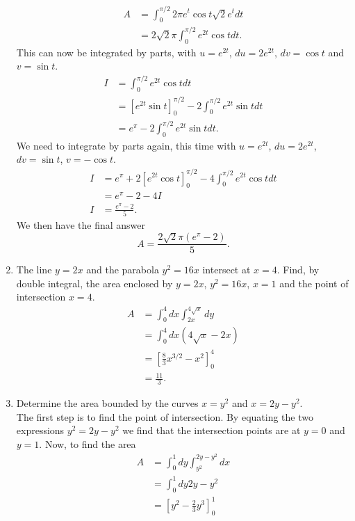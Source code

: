 \documentclass{article}
\begin{document}
\begin{enumerate}
{\begin{align*}
			A &= \int_0^{\pi/2} 2 \pi e^t \cos t \sqrt{2} e^t dt \\
			&= 2\sqrt{2} \pi \int_0^{\pi/2} e^{2t} \cos t dt .
		\end{align*}		
		This can now be integrated by parts, with $u = e^{2t}$, $du = 2e^{2t}$, $dv = \cos t$ and $v = \sin t$.  
		\begin{align*}
			I &= \int_0^{\pi/2} e^{2t} \cos t dt \\
			&= \left[ e^{2t} \sin t \right]_0^{\pi/2} - 2 \int_0^{\pi/2} e^{2t} \sin t dt \\
			&= e^{\pi} - 2 \int_0^{\pi/2} e^{2t} \sin t dt .
		\end{align*}			
		We need to integrate by parts again, this time with $u = e^{2t}$, $du = 2 e^{2t}$, $dv = \sin t$, $v = -\cos t$.
		\begin{align*}
			I &= e^{\pi} + 2\left[ e^{2t} \cos t\right]_0^{\pi/2} - 4 \int_0^{\pi/2} e^{2t} \cos t dt \\
			&= e^{\pi} - 2 - 4 I \\
			I &= \frac{e^\pi - 2}{5} .
		\end{align*}
		We then have the final answer
		\begin{equation*}
			A = \frac{2 \sqrt{2} \pi (e^\pi - 2)}{5} .
		\end{equation*}
	}
	\item{The line $y = 2x$ and the parabola $y^2 = 16x$ intersect at $x=4$.  Find, by double integral, the area enclosed by $y = 2x$, $y^2 = 16x$, $x=1$ and the point of intersection $x=4$.
		\begin{align*}
			A &= \int_0^4 dx \int_{2x}^{4\sqrt{x}} dy \\
			&= \int_0^4 dx \left( 4\sqrt{x} - 2x \right) \\
			&= \left[ \frac{8}{3} x^{3/2} - x^2 \right]_0^4 \\
			&= \frac{11}{3} .
		\end{align*}			
	}
	\item{Determine the area bounded by the curves $x=y^2$ and $x = 2y - y^2$.\\
		The first step is to find the point of intersection.  By equating the two expressions $y^2 = 2y - y^2$ we find that the intersection points are at $y = 0$ and $y=1$.
		Now, to find the area
		\begin{align*}
			A &= \int_0^1 dy \int_{y^2}^{2y-y^2} dx \\
			&= \int_0^1 dy 2y - y^2 \\
			&= \left[ y^2 -\frac{2}{3} y^3 \right]_0^1 \\

\end{align*}}
\end{enumerate}
\end{document}
